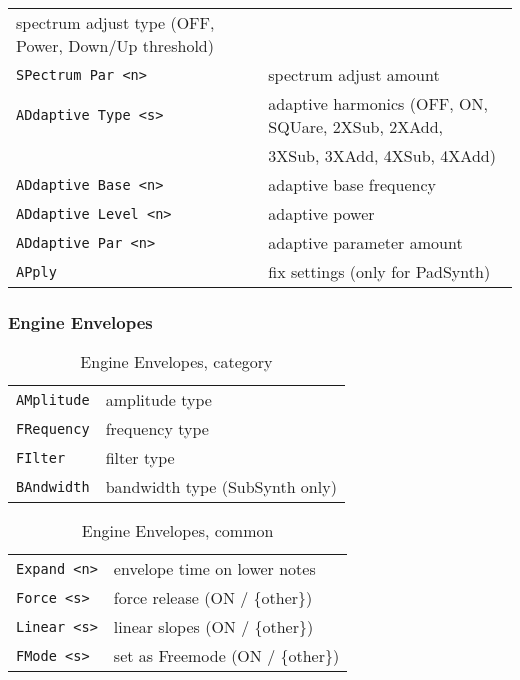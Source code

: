 \begin{table}[H]
\begin{tabular}{l l}
       spectrum adjust type (OFF, Power, Down/Up threshold) \\
   \texttt{SPectrum Par <n>} &
      spectrum adjust amount \\
   \texttt{ADdaptive Type <s>} &
      adaptive harmonics (OFF, ON, SQUare, 2XSub, 2XAdd, \\
   \texttt{} &
       3XSub, 3XAdd, 4XSub, 4XAdd) \\
   \texttt{ADdaptive Base <n>} &
      adaptive base frequency \\
   \texttt{ADdaptive Level <n>} &
      adaptive power \\
   \texttt{ADdaptive Par <n>} &
      adaptive parameter amount \\

   \texttt{APply} &
      fix settings (only for PadSynth) \\
      \end{tabular}
   \end{table}

\subsubsection{Engine Envelopes}
\label{subsec:command_line_engine_envelopes}

   \begin{table}[H]
      \centering
      \caption{Engine Envelopes, category}
      \label{table:yoshimi_engine_envelopes_types}
      \begin{tabular}{l l}
\texttt{AMplitude} &
   amplitude type \\
\texttt{FRequency} &
   frequency type \\
\texttt{FIlter} &
   filter type \\
\texttt{BAndwidth} &
   bandwidth type (SubSynth only) \\
      \end{tabular}
   \end{table}

   \begin{table}[H]
      \centering
      \caption{Engine Envelopes, common}
      \label{table:yoshimi_engine_envelopes_controls}
      \begin{tabular}{l l}
\texttt{Expand <n>} &
   envelope time on lower notes \\
\texttt{Force <s>} &
   force release (ON / \{other\}) \\
\texttt{Linear <s>} &
   linear slopes (ON / \{other\}) \\
\texttt{FMode <s>} &
   set as Freemode (ON / \{other\}) \\
      \end{tabular}
   \end{table}

